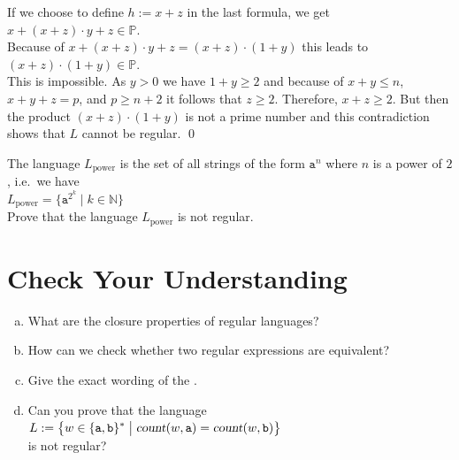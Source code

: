 If we choose to define $h := x + z$ in the last formula, we get
\\[0.2cm]
\hspace*{1.3cm}
$x + (x + z)\cdot y + z \in \mathbb{P}$.
\\[0.2cm]
Because of $x + (x + z)\cdot y + z = (x + z) \cdot (1 + y)$ this leads to
\\[0.2cm]
\hspace*{1.3cm}
$(x + z) \cdot (1 + y) \in \mathbb{P}$.
\\[0.2cm]
This is impossible. As $y > 0$ we have $1 + y \geq 2$ 
and because of $x + y \leq n$, $x + y + z = p$, and $p \geq n + 2$ it follows that
$z \geq 2$.  Therefore, $x + z \geq 2$.  But then the product
$(x + z) \cdot (1 + y)$ is not a prime number and this contradiction shows that $L$ cannot be regular.
\qed


\exerciseEng
The language $L_{\mathrm{power}}$ is the set of all strings of the form $\mathtt{a}^n$ where $n$ is a power of
$2$, i.e.~we have
\\[0.2cm]
\hspace*{1.3cm}
$L_{\mathrm{power}} = \bigl\{ \mathtt{a}^{2^k} \mid k \in \mathbb{N} \bigr\}$
\\[0.2cm]
Prove that the language $L_{\mathrm{power}}$ is not regular.
\eox

\section{Check Your Understanding}
\begin{enumerate}[(a)]
\item What are the closure properties of regular languages?
\item How can we check whether two regular expressions are equivalent?
\item Give the exact wording of the .
\item Can you prove that the language
      \\[0.2cm]
      \hspace*{1.3cm}
      $\displaystyle L := \bigl\{ w \in \{\texttt{a}, \texttt{b}\}^* \bigm| \textsl{count}(w, \texttt{a})=\textsl{count}(w, \texttt{b}) \bigr\}$
      \\[0.2cm]
      is not regular?
\end{enumerate}

